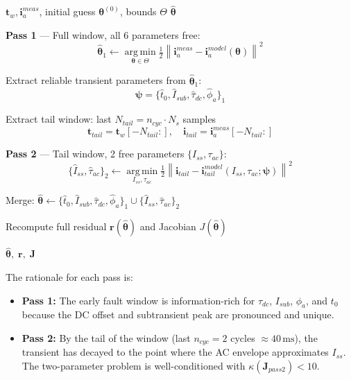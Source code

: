 \documentclass[12pt, a4paper]{article}
\theoremstyle{definition}
\theoremstyle{plain}
\newcommand{\vect}[1]{\bm{#1}}
\newcommand{\mat}[1]{\mathbf{#1}}
\newcommand{\norm}[1]{\left\|#1\right\|}
\newcommand{\argmin}{\operatorname*{arg\,min}}
\begin{document}
\begin{algorithm}[H]
\caption{Two-Pass Phase-A Inverse Estimator}
\label{alg:two_pass}
\begin{algorithmic}[1]
\Require $\vect{t}_w, \vect{i}_a^{meas}$, initial guess $\vect{\theta}^{(0)}$, bounds $\Theta$
\Ensure $\hat{\vect{\theta}}$

\State \textbf{Pass 1} — Full window, all 6 parameters free:
\[
  \hat{\vect{\theta}}_1 \leftarrow \argmin_{\vect{\theta}\in\Theta}
  \tfrac{1}{2}\norm{\vect{i}_a^{meas} - \vect{i}_a^{model}(\vect{\theta})}^2
\]

\State Extract reliable transient parameters from $\hat{\vect{\theta}}_1$:
\[
  \vect{\psi} = \{\hat{t}_0, \hat{I}_{sub}, \hat{\tau}_{dc}, \hat{\phi}_a\}_1
\]

\State Extract tail window: last $N_{tail} = n_{cyc} \cdot N_s$ samples
\[
  \vect{t}_{tail} = \vect{t}_w[-N_{tail}:], \quad
  \vect{i}_{tail} = \vect{i}_a^{meas}[-N_{tail}:]
\]

\State \textbf{Pass 2} — Tail window, 2 free parameters $\{I_{ss}, \tau_{ac}\}$:
\[
  \{\hat{I}_{ss}, \hat{\tau}_{ac}\}_2 \leftarrow
  \argmin_{I_{ss},\tau_{ac}}
  \tfrac{1}{2}\norm{\vect{i}_{tail} - \vect{i}_{tail}^{model}(I_{ss}, \tau_{ac}; \vect{\psi})}^2
\]

\State Merge: $\hat{\vect{\theta}} \leftarrow
  \{\hat{t}_0, \hat{I}_{sub}, \hat{\tau}_{dc}, \hat{\phi}_a\}_1
  \cup \{\hat{I}_{ss}, \hat{\tau}_{ac}\}_2$

\State Recompute full residual $\vect{r}(\hat{\vect{\theta}})$ and Jacobian $J(\hat{\vect{\theta}})$

\Return $\hat{\vect{\theta}},\; \vect{r},\; \mat{J}$
\end{algorithmic}
\end{algorithm}

The rationale for each pass is:
\begin{itemize}
  \item \textbf{Pass 1:} The early fault window is information-rich for
        $\tau_{dc}$, $I_{sub}$, $\phi_a$, and $t_0$ because the DC offset
        and subtransient peak are pronounced and unique.
  \item \textbf{Pass 2:} By the tail of the window (last $n_{cyc} = 2$
        cycles $\approx 40\,\text{ms}$), the transient has decayed to the point where
        the AC envelope approximates $I_{ss}$.  The two-parameter problem is
        well-conditioned with $\kappa(\mat{J}_{pass2}) < 10$.
\end{itemize}
\end{document}
